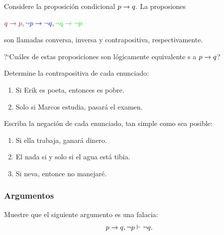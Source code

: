 \documentclass[xcolor={svgnames},
  hyperref={colorlinks}, 
  spanish, 12pt]{beamer}
\numberwithin{equation}{section} %
\numberwithin{figure}{section} %
\begin{document}
\begin{frame}
 \begin{solved}
  \label{lip:sol:4.7}
  Considere la proposici\'on condicional $p \rightarrow q.$ La proposiones 
  \begin{center}
  ${\color{red}q \rightarrow p,} {\color{blue}\, \neg p \rightarrow \neg q,} \, {\color{green}\neg q \rightarrow \neg p}$
  \end{center}
son llamadas {\color{red} conversa,} {\color{blue}inversa} y {\color{green} contrapositiva}, respectivamente.
\pause

?`Cu\'ales de estas proposiciones son l\'ogicamente equivalente s a $p\rightarrow q$?
 \end{solved}

\end{frame}

\begin{frame}
 \begin{solved}
  Determine la contrapositiva de cada enunciado:
  \begin{enumerate}
   \item Si Erik es poeta, entonces es pobre. \pause
   \item Solo si Marcos estudia, pasar\'a el examen. 
  \end{enumerate}

 \end{solved}

\end{frame}

\begin{frame}
 \begin{solved}
  Escriba la negaci\'on de cada enunciado, tan simple como sea posible:
  \begin{enumerate}
   \item Si ella trabaja, ganar\'a dinero. \pause
   \item El nada si y solo si el agua est\'a tibia. \pause
   \item Si neva, entonce no manejar\'e.
  \end{enumerate}

 \end{solved}

\end{frame}

\subsubsection{Argumentos}

\begin{frame}
 \begin{solved}
  Muestre que el siguiente argumento es una falacia:
 $$
 p\rightarrow q, \neg p \vdash \neg q.
 $$
 \end{solved}

\end{frame}
\end{document}
